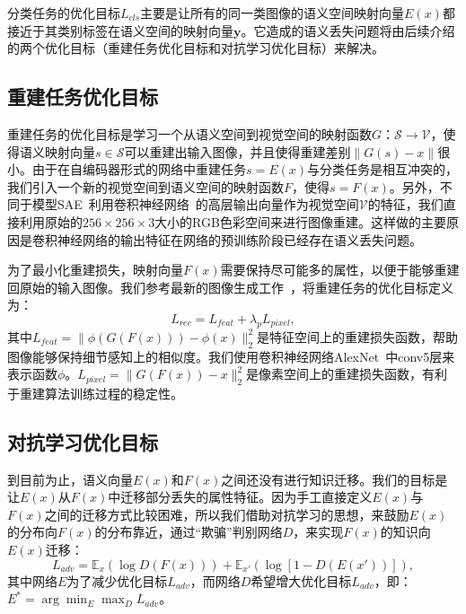分类任务的优化目标$L_{cls}$主要是让所有的同一类图像的语义空间映射向量$E(x)$都接近于其类别标签在语义空间的映射向量$\bm{y}$。它造成的语义丢失问题将由后续介绍的两个优化目标（重建任务优化目标和对抗学习优化目标）来解决。


\subsection{重建任务优化目标}
重建任务的优化目标是学习一个从语义空间到视觉空间的映射函数$G$：$\mathcal{S}\rightarrow \mathcal{V}$，使得语义映射向量$s\in\mathcal{S}$可以重建出输入图像，并且使得重建差别$\|G(s)-x\|$很小。由于在自编码器形式的网络中重建任务$s = E(x)$与分类任务是相互冲突的，我们引入一个新的视觉空间到语义空间的映射函数$F$，使得$s = F(x)$。另外，不同于模型SAE~\cite{kodirov2017semantic}利用卷积神经网络~\cite{he2016deep,simonyan2015very}的高层输出向量作为视觉空间$\mathcal{V}$的特征，我们直接利用原始的$256\times 256 \times 3$大小的RGB色彩空间来进行图像重建。这样做的主要原因是卷积神经网络的输出特征在网络的预训练阶段已经存在语义丢失问题。


为了最小化重建损失，映射向量$F(x)$需要保持尽可能多的属性，以便于能够重建回原始的输入图像。我们参考最新的图像生成工作~\cite{johnson2016perceptual,dosovitskiy2016generating,ledig2017photo}，将重建任务的优化目标定义为：
\begin{equation}\label{ch3:eq:eq_3}
L_{rec} = L_{feat}+\lambda_p L_{pixel},
\end{equation}
其中$L_{feat} = \|\phi\left(G\left(F(x)\right)\right)-\phi(x)\|^2_2$是特征空间上的重建损失函数，帮助图像能够保持细节感知上的相似度。我们使用卷积神经网络AlexNet~\cite{krizhevsky2012imagenet}中conv5层来表示函数$\phi$。$L_{pixel} = \|G(F(x))-x\|^2_2$是像素空间上的重建损失函数，有利于重建算法训练过程的稳定性。


\subsection{对抗学习优化目标}
到目前为止，语义向量$E(x)$和$F(x)$之间还没有进行知识迁移。我们的目标是让$E(x)$从$F(x)$中迁移部分丢失的属性特征。因为手工直接定义$E(x)$与$F(x)$之间的迁移方式比较困难，所以我们借助对抗学习的思想，来鼓励$E(x)$的分布向$F(x)$的分布靠近，通过“欺骗”判别网络$D$，来实现$F(x)$的知识向$E(x)$迁移：
\begin{equation} \label{ch3:eq:eq_4}
L_{adv} = \mathbb{E}_{x}\left( \log D(F(x)) \right) + \mathbb{E}_{x'}\left( \log \left[1-D(E(x'))\right] \right),
\end{equation}
其中网络$E$为了减少优化目标$L_{adv}$，而网络$D$希望增大优化目标$L_{adv}$，即：$E^* = \arg\min_E \max_D L_{adv}$。

